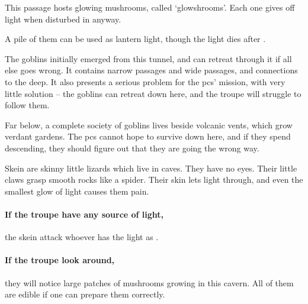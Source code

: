 \begin{multicols}{2}



This passage hosts glowing mushrooms, called `\glspl{glowshroom}'.
Each one gives off light when disturbed in anyway.

A pile of them can be used as lantern light, though the light dies after .




The goblins initially emerged from this tunnel, and can retreat through it if all else goes wrong.
It contains narrow passages and wide passages, and connections to the \gls{deep}.
It also presents a serious problem for the \glspl{pc}' mission, with very little solution -- the goblins can retreat down here, and the troupe will struggle to follow them.

Far below, a complete society of goblins lives beside volcanic vents, which grow verdant gardens.
The \glspl{pc} cannot hope to survive down here, and if they spend  descending, they should figure out that they are going the wrong way.

\caveMapOut


\begin{exampletext}
  Skein are skinny little lizards which live in caves.
  They have no eyes.
  Their little claws grasp smooth rocks like a spider.
  Their skin lets light through, and even the smallest glow of light causes them pain.
\end{exampletext}

\paragraph{If the troupe have any source of light,}
the skein attack whoever has the light as .

\skeinSwarm

\paragraph{If the troupe look around,}
they will notice large patches of mushrooms growing in this cavern.
All of them are edible if one can prepare them correctly.


\end{multicols}
